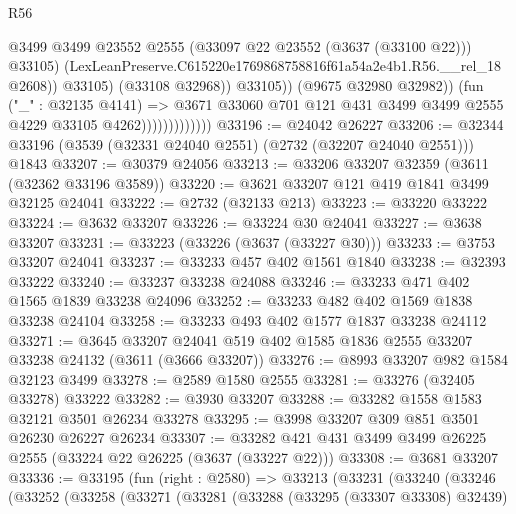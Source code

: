 \begin{lexlean}{R56}
\begin{coremodule}
                                          @3499
                                          @3499
                                          @23552
                                          @2555
                                          (@33097 @22 @23552 (@3637 (@33100 @22)))
                                          @33105)
                                        (LexLeanPreserve.C615220e1769868758816f61a54a2e4b1.R56.__rel_18
                                          @2608))
                                      @33105)
                                    (@33108 @32968))
                                  @33105))
                              (@9675 @32980 @32982))
                            (fun ("_" : @32135 @4141) =>
                            @3671
                              @33060
                              @701
                              @121
                              @431
                              @3499
                              @3499
                              @2555
                              @4229
                              @33105
                              @4262)))))))))))))
@33196 := @24042 @26227
@33206 := @32344 @33196 (@3539 (@32331 @24040 @2551) (@2732 (@32207 @24040 @2551))) @1843
@33207 := @30379 @24056
@33213 := @33206 @33207 @32359 (@3611 (@32362 @33196 @3589))
@33220 := @3621 @33207 @121 @419 @1841 @3499 @32125 @24041
@33222 := @2732 (@32133 @213)
@33223 := @33220 @33222
@33224 := @3632 @33207
@33226 := @33224 @30 @24041
@33227 := @3638 @33207
@33231 := @33223 (@33226 (@3637 (@33227 @30)))
@33233 := @3753 @33207 @24041
@33237 := @33233 @457 @402 @1561 @1840
@33238 := @32393 @33222
@33240 := @33237 @33238 @24088
@33246 := @33233 @471 @402 @1565 @1839 @33238 @24096
@33252 := @33233 @482 @402 @1569 @1838 @33238 @24104
@33258 := @33233 @493 @402 @1577 @1837 @33238 @24112
@33271 := @3645
    @33207
    @24041
    @519
    @402
    @1585
    @1836
    @2555
    @33207
    @33238
    @24132
    (@3611 (@3666 @33207))
@33276 := @8993 @33207 @982 @1584 @32123 @3499
@33278 := @2589 @1580 @2555
@33281 := @33276 (@32405 @33278) @33222
@33282 := @3930 @33207
@33288 := @33282 @1558 @1583 @32121 @3501 @26234 @33278
@33295 := @3998 @33207 @309 @851 @3501 @26230 @26227 @26234
@33307 := @33282 @421 @431 @3499 @3499 @26225 @2555 (@33224 @22 @26225 (@3637 (@33227 @22)))
@33308 := @3681 @33207
@33336 := @33195
    (fun (right : @2580) =>
    @33213
      (@33231
        (@33240
          (@33246
            (@33252
              (@33258
                (@33271
                  (@33281
                    (@33288
                      (@33295 (@33307 @33308) @32439)

\end{coremodule}
\end{lexlean}
